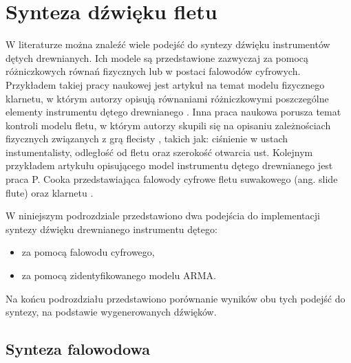 \section{Synteza dźwięku fletu}

W literaturze można znaleźć wiele podejść do syntezy dźwięku instrumentów dętych drewnianych. Ich modele są przedstawione zazwyczaj za pomocą różniczkowych równań fizycznych lub w postaci falowodów cyfrowych. 
Przykładem takiej pracy naukowej jest artykuł na temat modelu fizycznego klarnetu, w którym autorzy opisują równaniami różniczkowymi poszczególne elementy instrumentu dętego drewnianego \cite{flute_klarnet}. Inna praca naukowa porusza temat kontroli modelu fletu, w którym autorzy skupili się na opisaniu zależnościach fizycznych związanych z grą flecisty \cite{flute_flecista}, takich jak: ciśnienie w ustach instumentalisty, odległość od fletu oraz szerokość otwarcia ust. Kolejnym przykładem artykułu opisującego model instrumentu dętego drewnianego jest praca P. Cooka przedstawiająca falowody cyfrowe fletu suwakowego (ang. slide flute) oraz klarnetu \cite{flute_cook}.



W niniejszym podrozdziale przedstawiono dwa podejścia do implementacji syntezy dźwięku drewnianego instrumentu dętego:
\begin{itemize}
	\setlength\itemsep{-3pt}
	\item za pomocą falowodu cyfrowego,
	\item za pomocą zidentyfikowanego modelu ARMA.
\end{itemize}
Na końcu podrozdziału przedstawiono porównanie wyników obu tych podejść do syntezy, na podstawie wygenerowanych dźwięków.

\subsection{Synteza falowodowa}

